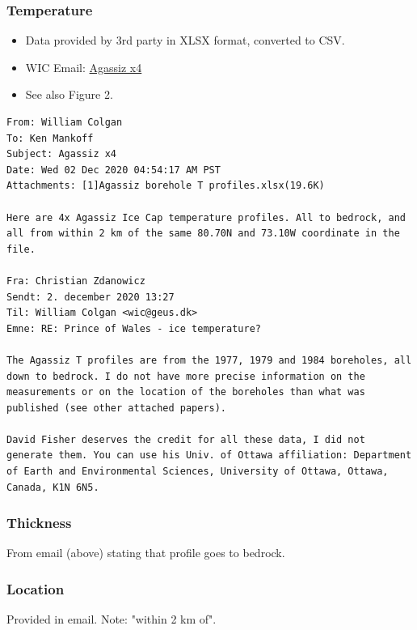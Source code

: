 \documentclass[article,a4paper,times,11pt,twoside]{article}
\begin{document}
\subsubsection{Temperature}
\label{sec:org9a44290}

\begin{itemize}
\item Data provided by 3rd party in XLSX format, converted to CSV.
\item WIC Email: \href{msgid:AM0PR04MB6129DE88C9253A951702EE06A2F30@AM0PR04MB6129.eurprd04.prod.outlook.com}{Agassiz x4}
\item See also \textcite{clarke_1987_wind} Figure 2.
\end{itemize}

\begin{verbatim}
From: William Colgan
To: Ken Mankoff
Subject: Agassiz x4
Date: Wed 02 Dec 2020 04:54:17 AM PST
Attachments: [1]Agassiz borehole T profiles.xlsx(19.6K)

Here are 4x Agassiz Ice Cap temperature profiles. All to bedrock, and
all from within 2 km of the same 80.70N and 73.10W coordinate in the
file.

Fra: Christian Zdanowicz
Sendt: 2. december 2020 13:27
Til: William Colgan <wic@geus.dk>
Emne: RE: Prince of Wales - ice temperature?

The Agassiz T profiles are from the 1977, 1979 and 1984 boreholes, all
down to bedrock. I do not have more precise information on the
measurements or on the location of the boreholes than what was
published (see other attached papers).

David Fisher deserves the credit for all these data, I did not
generate them. You can use his Univ. of Ottawa affiliation: Department
of Earth and Environmental Sciences, University of Ottawa, Ottawa,
Canada, K1N 6N5.
\end{verbatim}

\subsubsection{Thickness}
\label{sec:orgd50e491}

From email (above) stating that profile goes to bedrock.

\subsubsection{Location}
\label{sec:org631c26f}

Provided in email. Note: "within 2 km of".
\end{document}
